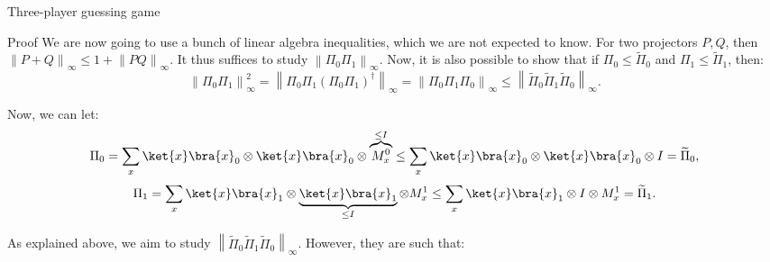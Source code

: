 \documentclass[a4paper]{article}
\begin{document}
\begin{parag}{Three-player guessing game}
\begin{subparag}{Proof}
        We are now going to use a bunch of linear algebra inequalities, which we are not expected to know. For two projectors $P, Q$, then $\left\|P + Q\right\|_{\infty} \leq 1 + \left\|PQ\right\|_{\infty}$. It thus suffices to study $\left\|\Pi_0 \Pi_1\right\|_{\infty}$. Now, it is also possible to show that if $\Pi_0 \leq \widetilde{\Pi}_0$ and $\Pi_1 \leq \widetilde{\Pi}_1$, then: 
        \[\left\|\Pi_0 \Pi_1\right\|_{\infty}^2 = \left\|\Pi_0 \Pi_1 \left(\Pi_0 \Pi_1\right)^{\dagger}\right\|_{\infty} = \left\|\Pi_0 \Pi_1 \Pi_0\right\|_{\infty} \leq \left\|\widetilde{\Pi}_0 \widetilde{\Pi}_1 \widetilde{\Pi}_0\right\|_{\infty}.\]
        


        Now, we can let: 
        \[\Pi_0 = \sum_{x} \ket{x}\bra{x}_0 \otimes \ket{x}\bra{x}_0 \otimes \overbrace{M_x^0}^{\leq I} \leq \sum_{x} \ket{x}\bra{x}_0 \otimes \ket{x}\bra{x}_0 \otimes I = \widetilde{\Pi}_0,\]
        \[\Pi_1 = \sum_{x} \ket{x}\bra{x}_1 \otimes \underbrace{\ket{x}\bra{x}_1}_{\leq I} \otimes M_x^1 \leq \sum_{x} \ket{x}\bra{x}_1 \otimes I \otimes M_x^1 = \widetilde{\Pi}_1.\]
        
        
        As explained above, we aim to study $\left\|\widetilde{\Pi}_0 \widetilde{\Pi}_1 \widetilde{\Pi}_0\right\|_{\infty}$. However, they are such that:
        

\end{subparag}
\end{parag}
\end{document}
